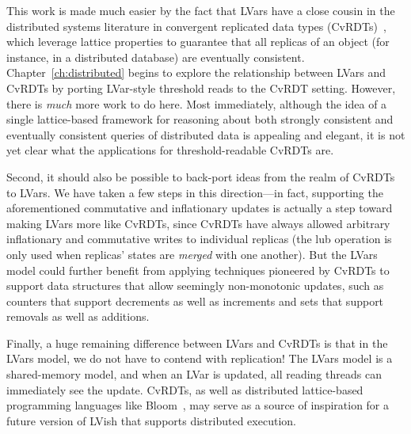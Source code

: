 This work is made much easier by the fact that LVars have a close
cousin in the distributed systems literature in convergent replicated
data types (CvRDTs)~\cite{crdts,crdts-tr}, which leverage lattice
properties to guarantee that all replicas of an object (for instance,
in a distributed database) are eventually consistent.
Chapter~\ref{ch:distributed} begins to explore the relationship
between LVars and CvRDTs by porting LVar-style threshold reads to the
CvRDT setting.  However, there is \emph{much} more work to do here.
Most immediately, although the idea of a single lattice-based
framework for reasoning about both strongly consistent and eventually
consistent queries of distributed data is appealing and elegant, it is
not yet clear what the applications for threshold-readable CvRDTs are.

Second, it should also be possible to back-port ideas from the realm
of CvRDTs to LVars.  We have taken a few steps in this direction---in
fact, supporting the aforementioned commutative and inflationary
updates is actually a step toward making LVars more like CvRDTs, since
CvRDTs have always allowed arbitrary inflationary and commutative
writes to individual replicas (the lub operation is only used when
replicas' states are \emph{merged} with one another).  But the LVars
model could further benefit from applying techniques pioneered by
CvRDTs to support data structures that allow seemingly non-monotonic
updates, such as counters that support decrements as well as
increments and sets that support removals as well as additions.

Finally, a huge remaining difference between LVars and CvRDTs is that
in the LVars model, we do not have to contend with replication!  The
LVars model is a shared-memory model, and when an LVar is updated, all
reading threads can immediately see the update.  CvRDTs, as well as
distributed lattice-based programming languages like
Bloom~\cite{bloom-cidr, blooml}, may serve as a source of inspiration
for a future version of LVish that supports distributed execution.


\fi

